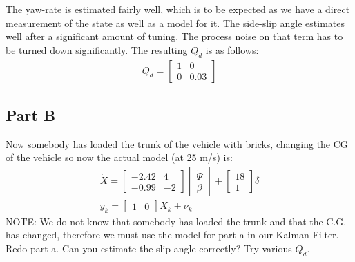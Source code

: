 \documentclass{article}
\begin{document}
The yaw-rate is estimated fairly well, which is to be expected as we have a direct measurement of the state as well as a model for it.  The side-slip angle estimates well after a significant amount of tuning.  The process noise on that term has to be turned down significantly.  The resulting $Q_d$ is as follows:
\begin{gather*}
    Q_d = \begin{bmatrix}
        1 & 0\\
        0 & 0.03
    \end{bmatrix}
\end{gather*}

\subsection*{Part B}
Now somebody has loaded the trunk of the vehicle with bricks, changing the CG of the vehicle so now the actual model (at 25 m/s) is:
\begin{gather}
    \dot{X} = \begin{bmatrix}
        -2.42 &  4 \\
        -0.99 & -2
    \end{bmatrix}\begin{bmatrix}
        \dot{\Psi} \\
        \beta
    \end{bmatrix} + \begin{bmatrix}
        18 \\
        1
    \end{bmatrix}\delta \\
    y_k = \begin{bmatrix}
        1 & 0
    \end{bmatrix}X_k + \nu_k 
\end{gather}
NOTE: We do not know that somebody has loaded the trunk and that the C.G. has changed, therefore we must use the model for part a in our Kalman Filter.\\
Redo part a. Can you estimate the slip angle correctly? Try various $Q_d$.
\end{document}
